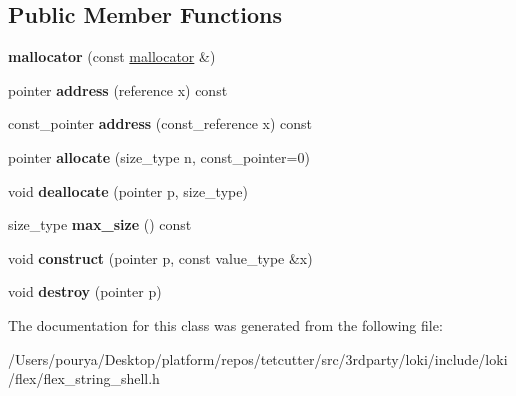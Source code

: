 \subsection*{Public Member Functions}
\begin{DoxyCompactItemize}
\item 
\hypertarget{classmallocator_affbaaa59e20b4d7a25c2a803515947c2}{}{\bfseries mallocator} (const \hyperlink{classmallocator}{mallocator} \&)\label{classmallocator_affbaaa59e20b4d7a25c2a803515947c2}

\item 
\hypertarget{classmallocator_ae5998072e05ff38d8d99e934af2a0ce5}{}pointer {\bfseries address} (reference x) const \label{classmallocator_ae5998072e05ff38d8d99e934af2a0ce5}

\item 
\hypertarget{classmallocator_af69a976e6e3f22942e27efc84aa3bd72}{}const\+\_\+pointer {\bfseries address} (const\+\_\+reference x) const \label{classmallocator_af69a976e6e3f22942e27efc84aa3bd72}

\item 
\hypertarget{classmallocator_a6f015ccd8074eb965ccd77ca3f805811}{}pointer {\bfseries allocate} (size\+\_\+type n, const\+\_\+pointer=0)\label{classmallocator_a6f015ccd8074eb965ccd77ca3f805811}

\item 
\hypertarget{classmallocator_a5d15671f1cb53e6c9d28c318db74ede8}{}void {\bfseries deallocate} (pointer p, size\+\_\+type)\label{classmallocator_a5d15671f1cb53e6c9d28c318db74ede8}

\item 
\hypertarget{classmallocator_aac226d0fb39780ebec085feae5453637}{}size\+\_\+type {\bfseries max\+\_\+size} () const \label{classmallocator_aac226d0fb39780ebec085feae5453637}

\item 
\hypertarget{classmallocator_a365013f06905ba9caec790070ca32116}{}void {\bfseries construct} (pointer p, const value\+\_\+type \&x)\label{classmallocator_a365013f06905ba9caec790070ca32116}

\item 
\hypertarget{classmallocator_ac1e3ca0506b8ea9e0af1c3057537aa67}{}void {\bfseries destroy} (pointer p)\label{classmallocator_ac1e3ca0506b8ea9e0af1c3057537aa67}

\end{DoxyCompactItemize}


The documentation for this class was generated from the following file\+:\begin{DoxyCompactItemize}
\item 
/\+Users/pourya/\+Desktop/platform/repos/tetcutter/src/3rdparty/loki/include/loki/flex/flex\+\_\+string\+\_\+shell.\+h\end{DoxyCompactItemize}
